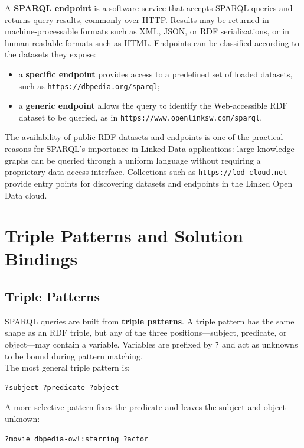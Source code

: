 \documentclass{scrbook}
\begin{document}
	A \textbf{SPARQL endpoint} is a software service that accepts SPARQL queries and returns query results, commonly over HTTP. Results may be returned in machine-processable formats such as XML, JSON, or RDF serializations, or in human-readable formats such as HTML. Endpoints can be classified according to the datasets they expose:
	\begin{itemize}
	    \item a \textbf{specific endpoint} provides access to a predefined set of loaded datasets, such as \texttt{https://dbpedia.org/sparql};
	    \item a \textbf{generic endpoint} allows the query to identify the Web-accessible RDF dataset to be queried, as in \texttt{https://www.openlinksw.com/sparql}.
	\end{itemize}
	
	The availability of public RDF datasets and endpoints is one of the practical reasons for SPARQL's importance in Linked Data applications: large knowledge graphs can be queried through a uniform language without requiring a proprietary data access interface. Collections such as \texttt{https://lod-cloud.net} provide entry points for discovering datasets and endpoints in the Linked Open Data cloud.
	
	\section{Triple Patterns and Solution Bindings}
	
	\subsection{Triple Patterns}
	
	SPARQL queries are built from \textbf{triple patterns}. A triple pattern has the same shape as an RDF triple, but any of the three positions---subject, predicate, or object---may contain a variable. Variables are prefixed by \texttt{?} and act as unknowns to be bound during pattern matching.\\
	
	The most general triple pattern is:
	
	\begin{lstlisting}
?subject ?predicate ?object
	\end{lstlisting}
	
	A more selective pattern fixes the predicate and leaves the subject and object unknown:
	
	\begin{lstlisting}
?movie dbpedia-owl:starring ?actor
	\end{lstlisting}
	
\end{document}
